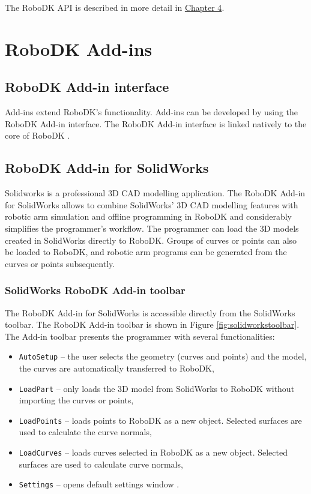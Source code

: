 The RoboDK API is described in more detail in \hyperref[chap:implementation]{Chapter 4}.

\section{RoboDK Add-ins}

\subsection{RoboDK Add-in interface}

Add-ins extend RoboDK's functionality. Add-ins can be developed by using the RoboDK Add-in interface. The RoboDK Add-in interface is linked natively to the core of RoboDK \cite{robodkaddininterface}.

\subsection{RoboDK Add-in for SolidWorks}

Solidworks is a professional 3D CAD modelling application. The RoboDK Add-in for SolidWorks allows to combine SolidWorks' 3D CAD modelling features with robotic arm simulation and offline programming in RoboDK and considerably simplifies the programmer's workflow. The programmer can load the 3D models created in SolidWorks directly to RoboDK. Groups of curves or points can also be loaded to RoboDK, and robotic arm programs can be generated from the curves or points subsequently.

\subsubsection*{SolidWorks RoboDK Add-in toolbar}

The RoboDK Add-in for SolidWorks is accessible directly from the SolidWorks toolbar.  The RoboDK Add-in toolbar is shown in Figure  \ref{fig:solidworkstoolbar}. The Add-in toolbar presents the programmer with several functionalities:

\begin{itemize}
    \item \texttt{AutoSetup} -- the user selects the geometry (curves and points) and the model, the curves are automatically transferred to RoboDK,
    \item \texttt{LoadPart} -- only loads the 3D model from SolidWorks to RoboDK without importing the curves or points,
    \item \texttt{LoadPoints} -- loads points to RoboDK as a new object. Selected surfaces are used to calculate the curve normals, 
    \item \texttt{LoadCurves} --  loads curves selected in RoboDK as a new object. Selected surfaces are used to calculate curve normals, 
    \item \texttt{Settings} -- opens default settings window \cite{robodksolidworks}.
\end{itemize}

